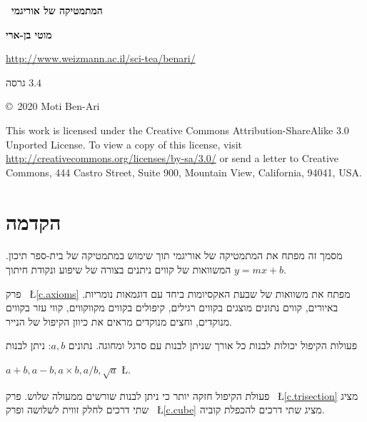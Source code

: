 
\thispagestyle{empty}

\begin{center}
\textbf{\Huge\ המתמטיקה של אוריגמי}

\bigskip
\bigskip

\textbf{\LARGE מוטי בן-ארי}

\bigskip
\bigskip
{}
\url{http://www.weizmann.ac.il/sci-tea/benari/}

\bigskip
\bigskip

{\large
גרסה
$3.4$
}
\end{center}

\vfill

\begin{small}
\begin{center}
\copyright{}\ 2020 Moti Ben-Ari
\end{center}

This work is licensed under the Creative Commons Attribution-ShareAlike 3.0 Unported License. To view a copy of this license, visit \url{http://creativecommons.org/licenses/by-sa/3.0/} or send a letter to Creative Commons, 444 Castro Street, Suite 900, Mountain View, California, 94041, USA.
\end{small}
\tableofcontents



\chapter{הקדמה}\label{c.introduction}

מסמך זה מפתח את המתמטיקה של אוריגמי תוך שימוש במתמטיקה של בית-ספר תיכון. המשוואות של קווים ניתנים בצורה של שיפוע ונקודת חיתוך
$y=mx+b$.

פרק%
~\L{\ref{c.axioms}}
מפתח את משוואות של שבעת האקסיומות ביחד עם דוגמאות נומריות. באיורים, קווים נתונים מוצגים בקווים רגילים, קיפולים בקווים מקווקווים, קווי עזר בקווים מנוקדים, וחצים מנוקדים מראים את כיוון הקיפול של הנייר.

פעולות הקיפול יכולות לבנות כל אורך שניתן לבנות עם סרגל ומחוגה. נתונים 
$a,b$:
ניתן לבנות

$a+b, a-b, a\times b, a/b, \sqrt{a}$
\L{\cite[4~]{hwa}}.

פעולת הקיפול חזקה יותר כי ניתן לבנות שורשים ממעולה שלוש. פרק%
~\L{\ref{c.trisection}}
מציג שתי דרכים לחלק זווית לשלושה ופרק%
~\L{\ref{c.cube}}
מציג שתי דרכים להכפלת קוביה.

